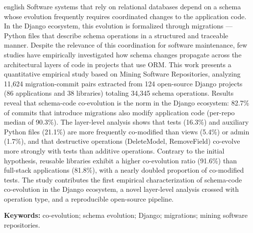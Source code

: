 \documentclass[
  12pt,
  openright,
  oneside,
  a4paper,
  brazil
]{abntex2}
\begin{document}
\begin{resumo}[Abstract]
\begin{otherlanguage*}{english}
Software systems that rely on relational databases depend on a schema whose evolution frequently requires coordinated changes to the application code. In the Django ecosystem, this evolution is formalized through migrations --- Python files that describe schema operations in a structured and traceable manner. Despite the relevance of this coordination for software maintenance, few studies have empirically investigated how schema changes propagate across the architectural layers of code in projects that use ORM. This work presents a quantitative empirical study based on Mining Software Repositories, analyzing 11,624 migration-commit pairs extracted from 124 open-source Django projects (86 applications and 38 libraries) totaling 34,345 schema operations. Results reveal that schema-code co-evolution is the norm in the Django ecosystem: 82.7\% of commits that introduce migrations also modify application code (per-repo median of 90.3\%). The layer-level analysis shows that tests (16.3\%) and auxiliary Python files (21.1\%) are more frequently co-modified than views (5.4\%) or admin (1.7\%), and that destructive operations (DeleteModel, RemoveField) co-evolve more strongly with tests than additive operations. Contrary to the initial hypothesis, reusable libraries exhibit a higher co-evolution ratio (91.6\%) than full-stack applications (81.8\%), with a nearly doubled proportion of co-modified tests. The study contributes the first empirical characterization of schema-code co-evolution in the Django ecosystem, a novel layer-level analysis crossed with operation type, and a reproducible open-source pipeline.

\vspace{\onelineskip}
\noindent\textbf{Keywords:} co-evolution; schema evolution; Django; migrations; mining software repositories.
\end{otherlanguage*}
\end{resumo}

\tableofcontents*
\cleardoublepage

\textual
\end{document}
